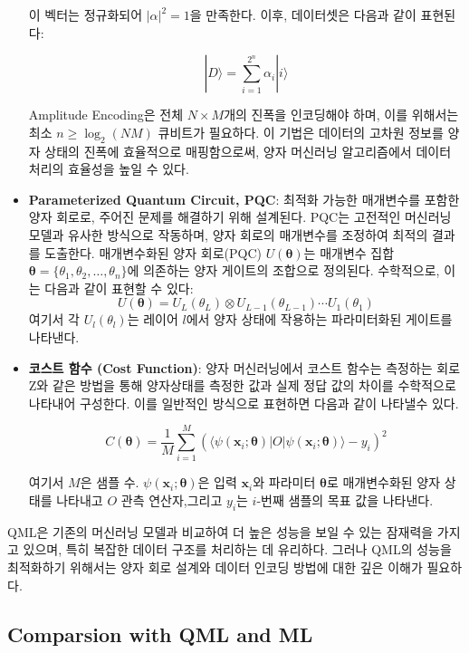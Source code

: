 \begin{itemize}
    이 벡터는 정규화되어 \( |\alpha|^2 = 1 \)을 만족한다. 이후, 데이터셋은 다음과 같이 표현된다:

    \[
    |D\rangle = \sum_{i=1}^{2^n} \alpha_i |i\rangle
    \]

    Amplitude Encoding은 전체 \( N \times M \)개의 진폭을 인코딩해야 하며, 이를 위해서는 최소 \( n \geq \log_2(NM) \) 큐비트가 필요하다. 이 기법은 데이터의 고차원 정보를 양자 상태의 진폭에 효율적으로 매핑함으로써, 양자 머신러닝 알고리즘에서 데이터 처리의 효율성을 높일 수 있다.

    \item \textbf{Parameterized Quantum Circuit, PQC}: 최적화 가능한 매개변수를 포함한 양자 회로로, 주어진 문제를 해결하기 위해 설계된다. PQC는 고전적인 머신러닝 모델과 유사한 방식으로 작동하며, 양자 회로의 매개변수를 조정하여 최적의 결과를 도출한다. 매개변수화된 양자 회로(PQC) \( U(\boldsymbol{\theta}) \)는 매개변수 집합 \( \boldsymbol{\theta} = \{\theta_1, \theta_2, \ldots, \theta_n\} \)에 의존하는 양자 게이트의 조합으로 정의된다. 수학적으로, 이는 다음과 같이 표현할 수 있다:
    \[
        U(\boldsymbol{\theta}) = U_L(\theta_L) \otimes U_{L-1}(\theta_{L-1}) \cdots U_1(\theta_1)
    \]
    여기서 각 \( U_l(\theta_l) \)는 레이어 \( l \)에서 양자 상태에 작용하는 파라미터화된 게이트를 나타낸다.

    \item \textbf{코스트 함수 (Cost Function)}: 양자 머신러닝에서 코스트 함수는  측정하는 회로 Z와 같은 방법을 통해 양자상태를 측정한 값과 실제 정답 값의 차이를 수학적으로 나타내어 구성한다. 이를 일반적인 방식으로 표현하면 다음과 같이 나타낼수 있다.

    \[
    C(\boldsymbol{\theta}) = \frac{1}{M} \sum_{i=1}^{M} \left( \langle \psi(\mathbf{x}_i; \boldsymbol{\theta}) | O | \psi(\mathbf{x}_i; \boldsymbol{\theta}) \rangle - y_i \right)^2
    \]

    여기서 \( M \)은  샘플 수.  \( \psi(\mathbf{x}_i; \boldsymbol{\theta}) \)은 입력 \( \mathbf{x}_i \)와 파라미터 \( \boldsymbol{\theta} \)로 매개변수화된 양자 상태를 나타내고 \( O \) 관측 연산자,그리고
       \( y_i \)는 \( i \)-번째 샘플의 목표 값을 나타낸다.

\end{itemize}

QML은 기존의 머신러닝 모델과 비교하여 더 높은 성능을 보일 수 있는 잠재력을 가지고 있으며, 특히 복잡한 데이터 구조를 처리하는 데 유리하다. 그러나 QML의 성능을 최적화하기 위해서는 양자 회로 설계와 데이터 인코딩 방법에 대한 깊은 이해가 필요하다.

\subsection{Comparsion with QML and ML}

